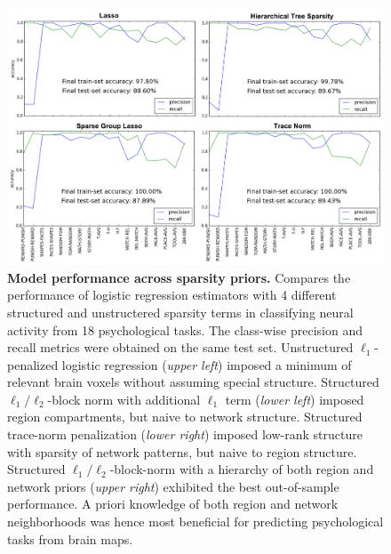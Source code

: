 \documentclass{article}
\begin{document}
\begin{figure}
\begin{centering}
\includegraphics[width=1.00\textwidth]{../figures/sparsities.pdf}
\end{centering}
\vspace{-0.6cm}
\caption{\textbf{Model performance across sparsity priors.}
Compares the performance of logistic regression estimators
with 4 different structured and unstructered sparsity terms
in classifying neural activity from 18 psychological tasks.
The class-wise precision and recall metrics
were obtained on the same test set.
%
Unstructured $\ell_1$-penalized logistic regression (\textit{upper left})
imposed a minimum of relevant brain voxels without
assuming special structure.
Structured $\ell_1/\ell_2$-block norm with additional $\ell_1$ term
(\textit{lower left})
imposed region compartments, but naive to network structure.
Structured trace-norm penalization (\textit{lower right})
imposed low-rank structure
with sparsity of network patterns, but naive to region structure.
Structured $\ell_1/\ell_2$-block-norm with a hierarchy of
both region and network priors (\textit{upper right})
exhibited the best out-of-sample performance.
%
A priori knowledge of both region and network neighborhoods
was hence most beneficial for predicting psychological tasks from
brain maps.
}
\label{fig_sparsities}
\end{figure}
\end{document}

